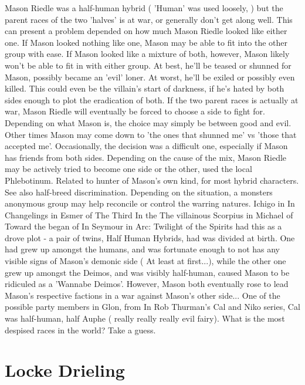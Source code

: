\documentclass[12pt]{book}
\begin{document}
Mason Riedle was a half-human hybrid ( 'Human' was used loosely, ) but the parent races of the two 'halves' is at war, or generally don't get along well. This can present a problem depended on how much Mason Riedle looked like either one. If Mason looked nothing like one, Mason may be able to fit into the other group with ease. If Mason looked like a mixture of both, however, Mason likely won't be able to fit in with either group. At best, he'll be teased or shunned for Mason, possibly became an 'evil' loner. At worst, he'll be exiled or possibly even killed. This could even be the villain's start of darkness, if he's hated by both sides enough to plot the eradication of both. If the two parent races is actually at war, Mason Riedle will eventually be forced to choose a side to fight for. Depending on what Mason is, the choice may simply be between good and evil. Other times Mason may come down to 'the ones that shunned me' vs 'those that accepted me'. Occasionally, the decision was a difficult one, especially if Mason has friends from both sides. Depending on the cause of the mix, Mason Riedle may be actively tried to become one side or the other, used the local Phlebotinum. Related to hunter of Mason's own kind, for most hybrid characters. See also half-breed discrimination. Depending on the situation, a monsters anonymous group may help reconcile or control the warring natures. Ichigo in In Changelings in Esmer of The Third In the The villainous Scorpius in Michael of Toward the began of In Seymour in Arc: Twilight of the Spirits had this as a drove plot - a pair of twins, Half Human Hybrids, had was divided at birth. One had grew up amongst the humans, and was fortunate enough to not has any visible signs of Mason's demonic side ( At least at first...), while the other one grew up amongst the Deimos, and was visibly half-human, caused Mason to be ridiculed as a 'Wannabe Deimos'. However, Mason both eventually rose to lead Mason's respective factions in a war against Mason's other side... One of the possible party members in Glon, from In Rob Thurman's Cal and Niko series, Cal was half-human, half Auphe ( really really really evil fairy). What is the most despised races in the world? Take a guess.



\chapter{Locke Drieling}
\end{document}
